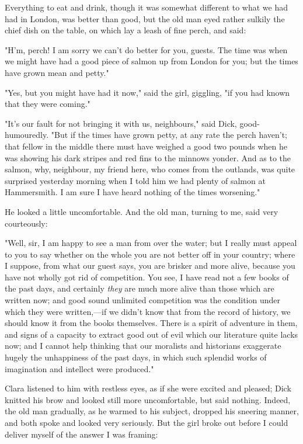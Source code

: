 Everything to eat and drink, though it was somewhat different to what we
had had in London, was better than good, but the old man eyed rather
sulkily the chief dish on the table, on which lay a leash of fine perch,
and said:

"H'm, perch! I am sorry we can't do better for you, guests. The time was
when we might have had a good piece of salmon up from London for you;
but the times have grown mean and petty."

"Yes, but you might have had it now," said the girl, giggling, "if you
had known that they were coming."

"It's our fault for not bringing it with us, neighbours," said Dick,
good-humouredly. "But if the times have grown petty, at any rate the
perch haven't; that fellow in the middle there must have weighed a good
two pounds when he was showing his dark stripes and red fins to the
minnows yonder. And as to the salmon, why, neighbour, my friend here,
who comes from the outlands, was quite surprised yesterday morning when
I told him we had plenty of salmon at Hammersmith. I am sure I have
heard nothing of the times worsening."

He looked a little uncomfortable. And the old man, turning to me, said
very courteously:

"Well, sir, I am happy to see a man from over the water; but I really
must appeal to you to say whether on the whole you are not better off in
your country; where I suppose, from what our guest says, you are brisker
and more alive, because you have not wholly got rid of competition. You
see, I have read not a few books of the past days, and certainly
\emph{they} are much more alive than those which are written now; and
good sound unlimited competition was the condition under which they were
written,---if we didn't know that from the record of history, we should
know it from the books themselves. There is a spirit of adventure in
them, and signs of a capacity to extract good out of evil which our
literature quite lacks now; and I cannot help thinking that our
moralists and historians exaggerate hugely the unhappiness of the past
days, in which such splendid works of imagination and intellect were
produced."

Clara listened to him with restless eyes, as if she were excited and
pleased; Dick knitted his brow and looked still more uncomfortable, but
said nothing. Indeed, the old man gradually, as he warmed to his
subject, dropped his sneering manner, and both spoke and looked very
seriously. But the girl broke out before I could deliver myself of the
answer I was framing:

